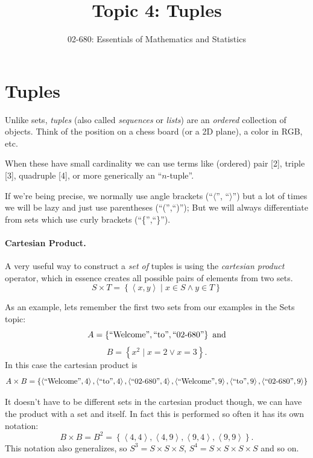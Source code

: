 


\title{Topic 4: Tuples}
\author{02-680: Essentials of Mathematics and Statistics}


\maketitle

\section{Tuples}
Unlike sets, \emph{tuples} (also called \emph{sequences} or \emph{lists}) are an \textit{ordered} collection of objects.
Think of the position on a chess board (or a 2D plane), a color in RGB, etc. 

When these have small cardinality we can use terms like (ordered) pair [2], triple [3], quadruple [4], or more generically an ``$n$-tuple''.

If we're being precise, we normally use angle brackets (``$\langle$'', ``$\rangle$'') but a lot of times we will be lazy and just use parentheses (``('',``)''); 
But we will always differentiate from sets which use curly brackets (``\{'',``\}'').

\paragraph{Cartesian Product.}
A very useful way to construct a \emph{set of} tuples is using the \emph{cartesian product} operator, 
which in essence creates all possible pairs of elements from two sets.
\[
S \times T = \left\{\left\langle x,y\right\rangle \mid x \in S \wedge y\in T\right\}
\]

As an example, lets remember the first two sets from our examples in the Sets topic: 
\[
A = \left\{\textnormal{``Welcome''}, \textnormal{``to''}, \textnormal{``02-680''}\right\} \textnormal{ and}
\]\[
B = \left\{x^2 \mid x=2 \vee x=3 \right\}.
\]
In this case the cartesian product is 
\[
A \times B = \left\{ \left\langle\textnormal{``Welcome''},4\right\rangle, \left\langle\textnormal{``to''},4\right\rangle, \left\langle\textnormal{``02-680''},4\right\rangle,
 \left\langle\textnormal{``Welcome''},9\right\rangle, \left\langle\textnormal{``to''},9\right\rangle, \left\langle\textnormal{``02-680''},9\right\rangle \right\}
\]

It doesn't have to be different sets in the cartesian product though, we can have the product with a set and itself.
In fact this is performed so often it has its own notation:
\[
B \times B = B^2 = \left\{ \left\langle 4,4 \right\rangle, \left\langle 4,9 \right\rangle,  \left\langle 9,4 \right\rangle, \left\langle 9,9 \right\rangle \right\}.
\]
This notation also generalizes, so $S^3 = S \times S \times S$, $S^4 = S\times S\times S\times S$ and so on.

